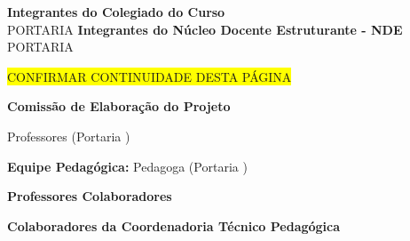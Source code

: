 \begin{center}
\textbf{Integrantes do Colegiado do Curso}\\
\vspace{0.5cm}
PORTARIA \PORTARIACOLEGIADOATUAL
\vspace{0.5cm}
\COLEGIADO
\newpage
\textbf{Integrantes do Núcleo Docente Estruturante - NDE}\\
\vspace{0.5cm}
PORTARIA \PORTARIANDEATUAL
\vspace{0.5cm}
\NDE


\pagebreak
\vspace{1cm}
\thispagestyle{empty}

\colorbox{yellow}{CONFIRMAR CONTINUIDADE DESTA PÁGINA}

\textbf{Comissão de Elaboração do Projeto}

\vspace{0.5cm}
Professores (Portaria \PORTARIACOMISSAO)
\vspace{0.5cm}

\MakeUppercase{\COMISSAO}

\vspace{0.5cm}
\vspace{1cm}
\textbf{Equipe Pedagógica:}
Pedagoga (Portaria \PORTARIACOMISSAOALT)
\vspace{0.5cm}

\MakeUppercase{\PEDAGOGO}

\vspace{1cm}
\textbf{Professores Colaboradores}

\MakeUppercase{\COLABORADORES}

\vspace{1cm}
\textbf{Colaboradores da Coordenadoria Técnico Pedagógica}

\MakeUppercase{\PEDAGOGOS}
\end{center}